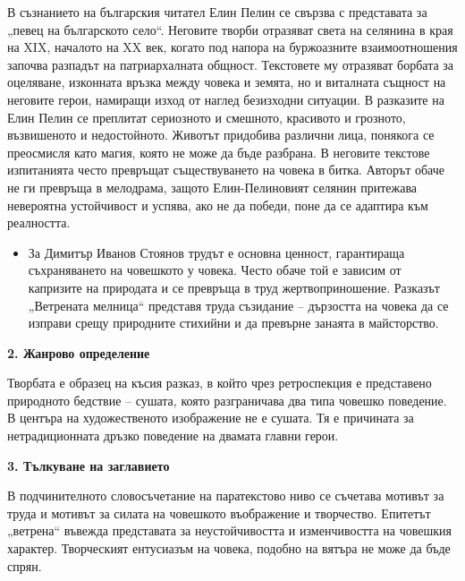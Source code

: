 \documentclass[12pt,a4paper]{article}
\begin{document}
\indent В съзнанието на българския читател Елин Пелин се свързва с представата за „певец на българското село“. Неговите творби отразяват света на селянина в края на XIX, началото на XX век, когато под напора на буржоазните взаимоотношения започва разпадът на патриархалната общност. Текстовете му отразяват борбата за оцеляване, изконната връзка между човека и земята, но и виталната същност на неговите герои, намиращи изход от наглед безизходни ситуации. В разказите на Елин Пелин се преплитат сериозното и смешното, красивото и грозното, възвишеното и недостойното. Животът придобива различни лица, понякога се преосмисля като магия, която не може да бъде разбрана. В неговите текстове изпитанията често превръщат съществуването на човека в битка. Авторът обаче не ги превръща в мелодрама, защото Елин-Пелиновият селянин притежава невероятна устойчивост и успява, ако не да победи, поне да се адаптира към реалността.

\begin{itemize}[leftmargin=*]
\vspace{-0.2cm}
\item За Димитър Иванов Стоянов трудът е основна ценност, гарантираща съхраняването на човешкото у човека. Често обаче той е зависим от капризите на природата и се превръща в труд жертвоприношение. Разказът „Ветрената мелница“ представя труда съзидание – дързостта на човека да се изправи срещу природните стихийни и да превърне занаята в майсторство.
\end{itemize}

\noindent 
\textbf{2. Жанрово определение}
\vspace{0.1cm}
 
\indent Творбата е образец на късия разказ, в който чрез ретроспекция е представено природното бедствие – сушата, която разграничава два типа човешко поведение. В центъра на художественото изображение не е сушата. Тя е причината за нетрадиционната дръзко поведение на двамата главни герои.

\vspace{0.1cm}

\noindent 
\textbf{3. Тълкуване на заглавието}
\vspace{0.1cm}
 
\indent В подчинителното словосъчетание на паратекстово ниво се съчетава мотивът за труда и мотивът за силата на човешкото въображение и творчество. Епитетът „ветрена“ въвежда представата за неустойчивостта и изменчивостта на човешкия характер. Творческият ентусиазъм на човека, подобно на вятъра не може да бъде спрян.
\end{document}
